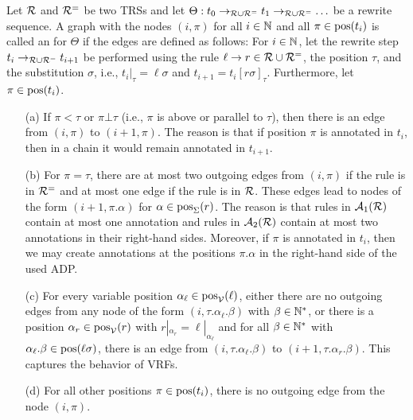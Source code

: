 \begin{definition}\label{def:orig}
    Let $\mathcal{R}$ and $\mathcal{R}^{=}$ be two TRSs 
    and let $\Theta: t_0 \to_{\mathcal{R} \cup \mathcal{R}^{=}} t_1 \to_{\mathcal{R} \cup \mathcal{R}^{=}} \ldots$ be a rewrite sequence.
    A graph with the nodes $(i,\pi)$ for all $i \in \mathbb{N}$ and all $\pi \in \mathrm{pos}(t_i)$
    is called an  for $\Theta$
    if the edges are defined as follows:
    For $i \in \mathbb{N}$,
    let
the rewrite step  $t_i \to_{\mathcal{R} \cup \mathcal{R}^{=}} t_{i+1}$ be performed using the rule
$\ell \to r \in \mathcal{R}\cup \mathcal{R}^{=}$, the position $\tau$, and the substitution $\sigma$,
i.e., $t_i|_\tau = \ell \sigma$ and $t_{i+1} = t_i[r \sigma]_\tau$.
    Furthermore, let $\pi \in \mathrm{pos}(t_i)$.
    \begin{itemize}
        \item[(a)] If $\pi < \tau$ or $\pi \bot \tau$ (i.e., $\pi$ is above or parallel to $\tau$),        
          then there is an edge from $(i,\pi)$ to $(i+1,\pi)$. The reason is that
          if position $\pi$ is annotated in $t_i$,
        then in a chain it would remain annotated in $t_{i+1}$.
      \item[(b)] For $\pi=\tau$,
        there are at most two outgoing edges from $(i,\pi)$ if
        the rule is in $\mathcal{R}^{=}$ and at most one edge if the rule is in $\mathcal{R}$. These edges
        lead to nodes of the
        form
        $(i+1,\pi.\alpha)$ for $\alpha \in \mathrm{pos}_{\Sigma}(r)$.
        The reason is that rules in $\mathcal{A}_{1}(\mathcal{R})$ contain at most one annotation and
        rules in $\mathcal{A}_{2}(\mathcal{R})$ contain at most two annotations in their right-hand sides. Moreover, 
        if $\pi$ is annotated in $t_{i}$, then we may create annotations
        at the positions $\pi.\alpha$ in the right-hand side 
        of the used ADP.
      \item[(c)] For every variable position
$\alpha_\ell \in \mathrm{pos}_{\mathcal{V}}(\ell)$, either there are no outgoing edges from any node of
        the form $(i,\tau.\alpha_\ell.\beta)$ with
 $\beta \in \mathbb{N}^*$, or there is a 
        position $\alpha_r \in \mathrm{pos}_{\mathcal{V}}(r)$ with
        $r|_{\alpha_r} = \ell|_{\alpha_\ell}$ and for all $\beta \in \mathbb{N}^*$ with
        $\alpha_\ell.\beta \in \mathrm{pos}(\ell\sigma)$, there is an edge from 
        $(i,\tau.\alpha_\ell.\beta)$ to $(i+1,\tau.\alpha_r.\beta)$. This captures the
        behavior of VRFs.
        \item[(d)] For all other positions $\pi \in \mathrm{pos}(t_i)$, there is no outgoing edge from the node $(i, \pi)$.
    \end{itemize}
\end{definition}


